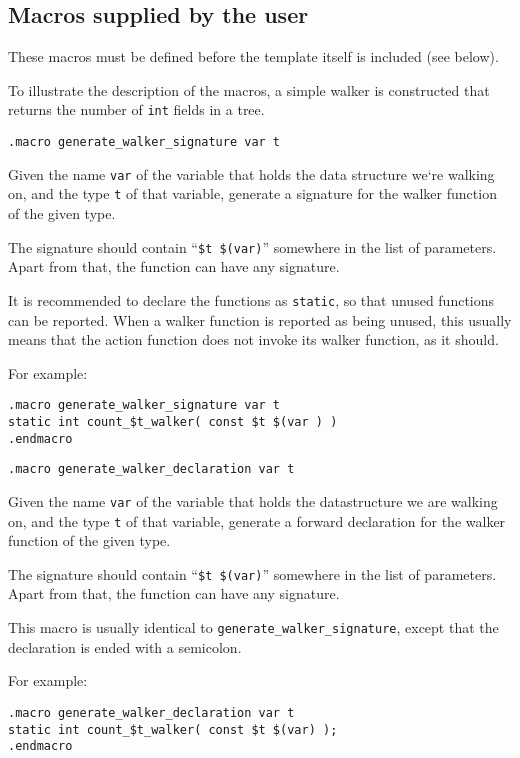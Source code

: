 \subsection{Macros supplied by the user}
These macros must be defined before the template itself is included
(see below).
\par
To illustrate the description of the macros, a simple walker is
constructed that returns the number of \texttt{int} fields in a tree.
\begin{verbatim}
.macro generate_walker_signature var t
\end{verbatim}
\begin{desc}
Given the name \verb'var' of the variable that holds the data structure
we`re walking on, and the type \verb't' of that variable, generate a
signature for the walker function of the given type.
\par
The signature should contain ``\verb'$t $(var)''' somewhere in the list
of parameters. Apart from that, the function can have any signature.
\par
It is recommended to declare the functions as \verb'static', so that
unused functions can be reported. When a walker function is reported
as being unused, this usually means that the
action function does not invoke its walker function, as it should.
\par
For example:
\begin{verbatim}
.macro generate_walker_signature var t
static int count_$t_walker( const $t $(var ) )
.endmacro
\end{verbatim}
\end{desc}
\begin{verbatim}
.macro generate_walker_declaration var t
\end{verbatim}
\begin{desc}
Given the name \verb'var' of the variable that holds the datastructure
we are walking on, and the type \verb't' of that variable, generate a forward
declaration for the walker function of the given type.
\par
The signature should contain ``\verb'$t $(var)''' somewhere in the list
of parameters. Apart from that, the function can have any signature.
\par
This macro is usually identical to \verb'generate_walker_signature',
except that the declaration is ended with a semicolon.
\par
For example:
\begin{verbatim}
.macro generate_walker_declaration var t
static int count_$t_walker( const $t $(var) );
.endmacro
\end{verbatim}
\end{desc}
